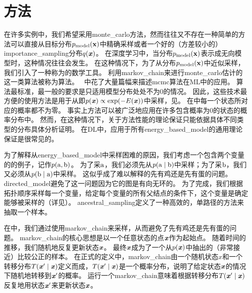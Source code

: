 \section{方法}
\label{sec:markov_chain_monte_carlo_methods}

在许多实例中，我们希望采用\gls{monte_carlo}方法，然而往往又不存在一种简单的方法可以直接从目标分布$p_{\text{model}}(\mathbf{x})$中精确采样或者一个好的（方差较小的）\gls{importance_sampling}分布$q(\boldsymbol{\mathit{x}})$。 
在深度学习中，当分布$p_{\text{model}}(\mathbf{x})$表示成无向模型时，这种情况往往会发生。
在这种情况下，为了从分布$p_{\text{model}}(\mathbf{x})$中近似采样，我们引入了一种称为的数学工具。
利用\gls{markov_chain}来进行\gls{monte_carlo}估计的这一类算法被称为算法。
~\citet{koller-book2009}中花了大量篇幅来描述\gls{mcmc}算法在\gls{ML}中的应用。
算法最标准，最一般的要求是只适用模型分布处处不为$0$的情况。
因此，这些技术最方便的使用方法是用于从即$p(\boldsymbol{\mathit{x}})\propto \exp(-E(\boldsymbol{\mathit{x}}))$中采样，见。
在中每一个状态所对应的概率都不为零。
事实上方法可以被广泛地应用在许多包含概率为$0$的状态的概率分布中。
然而，在这种情况下，关于方法性能的理论保证只能依据具体不同类型的分布具体分析证明。
在\gls{DL}中，应用于所有\gls{energy_based_model}的通用理论保证是很常见的。


为了解释从\gls{energy_based_model}中采样困难的原因，我们考虑一个包含两个变量的的例子，记作$p(\mathrm{a},\mathrm{b})$。  
为了采$\mathrm{a}$，我们必须先从$p(\mathrm{a}\mid \mathrm{b})$中采样；为了采$\mathrm{b}$，我们又必须从$p(\mathrm{b}\mid \mathrm{a})$中采样。   
这似乎成了难以解释的先有鸡还是先有蛋的问题。
\gls{directed_model}避免了这一问题因为它的图是有向无环的。
为了完成，我们根据拓扑顺序采样每一个变量，给定每个变量的所有父结点的条件下，这个变量是确定能够被采样的（详见）。   
\gls{ancestral_sampling}定义了一种高效的，单路径的方法来抽取一个样本。   


在中，我们通过使用\gls{markov_chain}来采样，从而避免了先有鸡还是先有蛋的问题。  
\gls{markov_chain}的核心思想是以一个任意状态的点$\boldsymbol{\mathit{x}}$作为起始点。
随着时间的推移，我们随机地反复更新状态$\boldsymbol{\mathit{x}}$。  
最终$\boldsymbol{\mathit{x}}$成为了一个从$p(\boldsymbol{\mathit{x}})$中抽出的（非常接近）比较公正的样本。  %
在正式的定义中，\gls{markov_chain}由一个随机状态$x$和一个转移分布$T(\boldsymbol{\mathit{x}}'\mid \boldsymbol{\mathit{x}})$定义而成，$T(\boldsymbol{\mathit{x}}'\mid \boldsymbol{\mathit{x}})$是一个概率分布，说明了给定状态$\boldsymbol{\mathit{x}}$的情况下随机地转移到$\boldsymbol{\mathit{x}}'$的概率。
运行一个\gls{markov_chain}意味着根据转移分布$T(\boldsymbol{\mathit{x}}'\mid \boldsymbol{\mathit{x}})$反复地用状态$\boldsymbol{\mathit{x}}'$来更新状态$\boldsymbol{\mathit{x}}$。  


